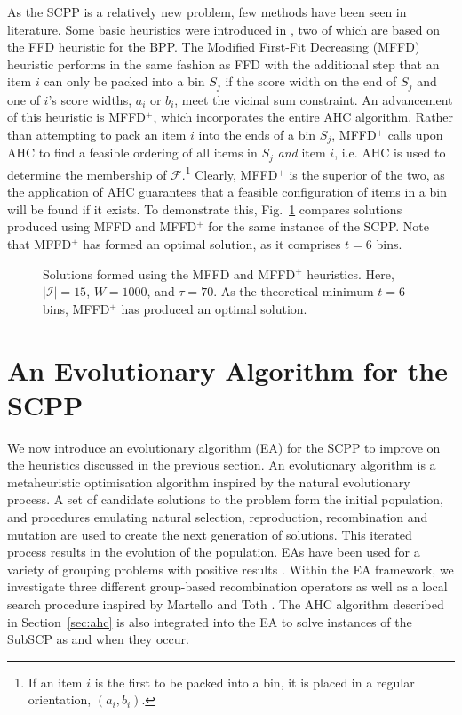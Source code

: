 \documentclass{IEEEtran}
\begin{document}
As the SCPP is a relatively new problem, few methods have been seen in literature. Some basic heuristics were introduced in \cite{hawa2018}, two of which are based on the FFD heuristic for the BPP. The Modified First-Fit Decreasing (MFFD) heuristic performs in the same fashion as FFD with the additional step that an item $i$ can only be packed into a bin $S_j$ if the score width on the end of $S_j$ and one of $i$'s score widths, $a_i$ or $b_i$, meet the vicinal sum constraint. An advancement of this heuristic is MFFD$^+$, which incorporates the entire AHC algorithm. Rather than attempting to pack an item $i$ into the ends of a bin $S_j$, MFFD$^+$ calls upon AHC to find a feasible ordering of all items in $S_j$ \emph{and} item $i$, i.e. AHC is used to determine the membership of $\mathcal{F}$.\footnote{If an item $i$ is the first to be packed into a bin, it is placed in a regular orientation, $(a_i, b_i)$.} Clearly, MFFD$^+$ is the superior of the two, as the application of AHC guarantees that a feasible configuration of items in a bin will be found if it exists. To demonstrate this, Fig.~\ref{fig:mffdvsmffdplus} compares solutions produced using MFFD and MFFD$^+$ for the same instance of the SCPP. Note that MFFD$^+$ has formed an optimal solution, as it comprises $t = 6$ bins.

\begin{figure}[H]	
	\centering
	\subfloat[MFFD]{
	\label{fig:mffd}}
	\vspace{1mm}
	\subfloat[MFFD$^+$]{
	\label{fig:mffdplus}}
	\caption{Solutions formed using the MFFD and MFFD$^+$ heuristics. Here, $|\mathcal{I}| = 15$, $W = 1000$, and $\tau = 70$. As the theoretical minimum $t = 6$ bins, MFFD$^+$ has produced an optimal solution.}
	\label{fig:mffdvsmffdplus}
\end{figure}

\section{An Evolutionary Algorithm for the SCPP}
\label{sec:ea}
We now introduce an evolutionary algorithm (EA) for the SCPP to improve on the heuristics discussed in the previous section. An evolutionary algorithm is a metaheuristic optimisation algorithm inspired by the natural evolutionary process. A set of candidate solutions to the problem form the initial population, and procedures emulating natural selection, reproduction, recombination and mutation are used to create the next generation of solutions. This iterated process results in the evolution of the population. EAs have been used for a variety of grouping problems with positive results \cite{lewis2017, falkenauer1996, quiroz2015}. Within the EA framework, we investigate three different group-based recombination operators as well as a local search procedure inspired by Martello and Toth \cite{martello1990l}. The AHC algorithm described in Section~\ref{sec:ahc} is also integrated into the EA to solve instances of the SubSCP as and when they occur.
\end{document}
